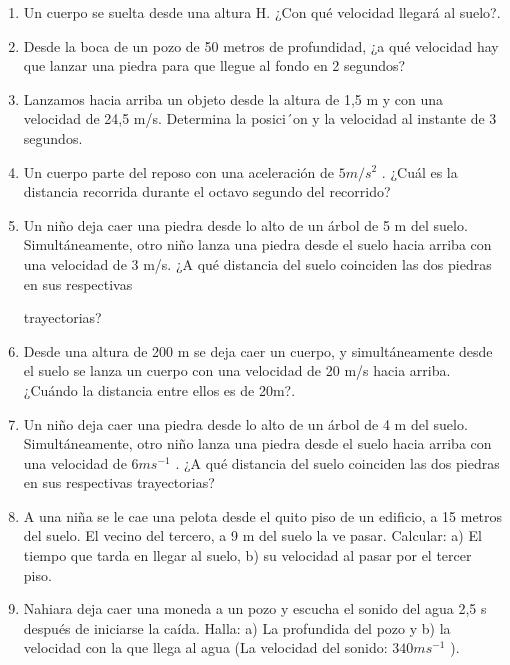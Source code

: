 \documentclass[a5paper,pagesize,10pt,bibtotoc,pointlessnumbers,
normalheadings,DIV=9,fleqn,x11names,table,twoside=false]{scrbook}
\begin{document}
\begin{enumerate}
\item Un cuerpo se suelta desde una altura H. ¿Con qué velocidad llegará al suelo?.

\item Desde la boca de un pozo de 50 metros de profundidad, ¿a qué velocidad hay que lanzar una
 piedra para que llegue al fondo 
en 2 segundos?

\item Lanzamos hacia arriba un objeto desde la altura de 1,5 m y con una velocidad de 24,5 m/s.
 Determina la posici´on y la 
velocidad al instante de 3 segundos.


\item  Un cuerpo parte del reposo con una aceleración de $5 m/s^2$
.
 ¿Cuál es la distancia recorrida durante el octavo segundo 
del recorrido?

\item  Un niño deja caer una piedra desde lo alto de un árbol de 5
 m del suelo. Simultáneamente, otro niño lanza una piedra 
desde el suelo hacia arriba con una
 velocidad de 3 m/s. ¿A qué distancia del suelo coinciden las dos piedras en sus respectivas

trayectorias?

\item  Desde una altura de 200
 m se deja caer un cuerpo, y simultáneamente desde el suelo se lanza un cuerpo con una
 velocidad 
de 20 m/s hacia arriba. ¿Cuándo la distancia entre ellos es de 20m?.


\item Un niño deja caer una piedra desde lo alto de un árbol de 4 m del suelo. Simultáneamente,
 otro niño lanza una piedra desde 
el suelo hacia arriba con una velocidad de $6 ms^{−1}$
. ¿A qué distancia del
 suelo coinciden las dos piedras en sus respectivas 
trayectorias?

\item A una niña se le cae una pelota desde el quito piso de un edificio, a 15 metros del suelo.
 El vecino del tercero, a 9 m 
del suelo la ve pasar. Calcular: a) El tiempo que tarda en llegar al suelo, b) su
 velocidad al pasar por el tercer piso.


\item Nahiara deja caer una moneda a un pozo y escucha el sonido del agua 2,5 s después de
 iniciarse la caída. Halla: a) La 
profundida del pozo y b) la velocidad con la que llega al agua (La velocidad
 del sonido: $340ms^{−1}$
).

\end{enumerate}
\end{document}
